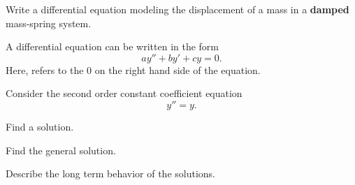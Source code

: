 \begin{applicationActivities}
\begin{activity}{5}
Write a differential equation modeling the displacement of a mass in a \textbf{damped} mass-spring system.
\end{activity}

\begin{definition}
A  differential equation can be written in the form
\[ay''+by'+cy=0.\]
Here,  refers to the \(0\) on the right hand side of the equation.
\end{definition}

\begin{activity}{15}
Consider the second order constant coefficient equation \[y''=y.\]
\begin{subactivity}
Find a solution.
\end{subactivity}
\begin{subactivity}
Find the general solution.
\end{subactivity}
\begin{subactivity}
Describe the long term behavior of the solutions.
\end{subactivity}
\end{activity}




\end{applicationActivities}
